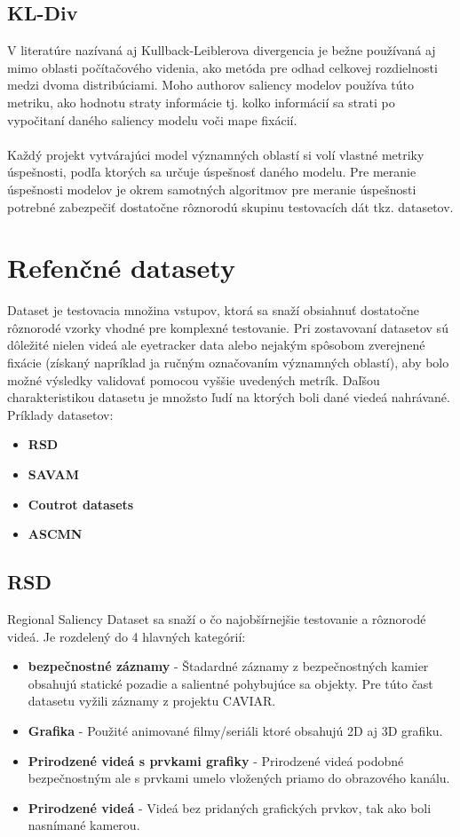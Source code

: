 \subsection{KL-Div}
V literatúre nazívaná aj Kullback-Leiblerova divergencia\cite{kldiv} je bežne používaná aj mimo oblasti počítačového videnia, ako metóda pre odhad celkovej rozdielnosti medzi dvoma distribúciami.
Moho authorov saliency modelov používa túto metriku, ako hodnotu straty informácie tj. kolko informácií sa strati po vypočitaní daného saliency modelu voči mape fixácií.
\\\\
Každý projekt vytvárajúci model významných oblastí si volí vlastné metriky úspešnosti, podľa ktorých sa určuje úspešnosť daného modelu.
Pre meranie úspešnosti modelov je okrem samotných algoritmov pre meranie úspešnosti potrebné zabezpečiť dostatočne rôznorodú skupinu testovacích dát tkz. datasetov.

\section{Refenčné datasety}
Dataset je testovacia množina vstupov, ktorá sa snaží obsiahnuť dostatočne rôznorodé vzorky vhodné pre komplexné testovanie.
Pri zostavovaní datasetov sú dôležité nielen videá ale eyetracker data alebo nejakým spôsobom zverejnené fixácie (získaný napríklad ja ručným označovaním významných oblastí), aby bolo možné výsledky validovať pomocou vyššie uvedených metrík.
Daľšou charakteristikou datasetu je množsto ľudí na ktorých boli dané viedeá nahrávané.
\\ Príklady datasetov:
\begin{itemize}
	\item \textbf{RSD}\cite{rsd}
	\item \textbf{SAVAM}\cite{savam}
	\item \textbf{Coutrot datasets}\cite{courot-dataset}
  \item \textbf{ASCMN}\cite{accv}
\end{itemize}

\subsection{RSD}
Regional Saliency Dataset sa snaží o čo najobšírnejšie testovanie a rôznorodé videá.
Je rozdelený do 4 hlavných kategórií: \\
\begin{itemize}
	\item \textbf{bezpečnostné záznamy} - Štadardné záznamy z bezpečnostných kamier obsahujú statické pozadie a salientné pohybujúce sa objekty.
Pre túto čast datasetu vyžili záznamy z projektu CAVIAR\cite{rsd-caviar}.
	\item \textbf{Grafika} - Použité animované filmy/seriáli ktoré obsahujú 2D aj 3D grafiku.
  \item \textbf{Prirodzené videá s prvkami grafiky} - Prirodzené videá  podobné bezpečnostným ale s prvkami umelo vložených priamo do obrazového kanálu.
  \item \textbf{Prirodzené videá} - Videá bez pridaných grafických prvkov, tak ako boli nasnímané kamerou.
\end{itemize}

